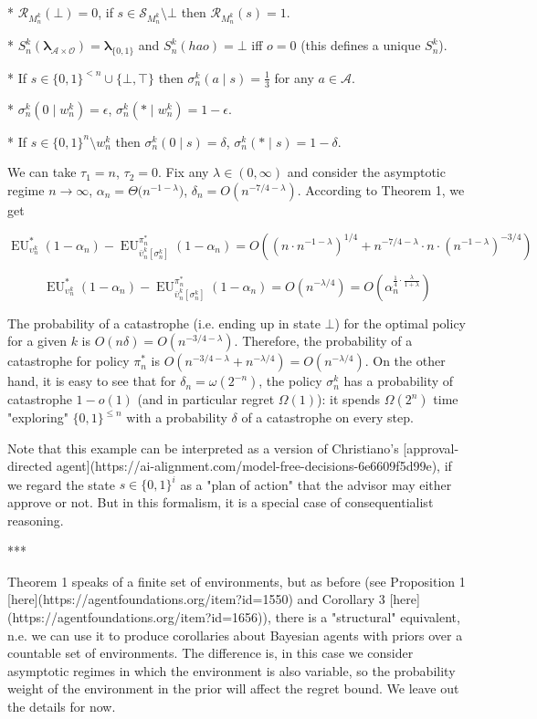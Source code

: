 \documentclass[a4paper]{article}
\newcommand{\Bool}{\{0,1\}}
\newcommand{\AP}[1]{\left(#1\right)}
\newcommand{\AB}[1]{\left[#1\right]}
\newcommand{\Estr}{\boldsymbol{\lambda}}
\newcommand{\Ob}{\mathcal{O}}
\newcommand{\A}{\mathcal{A}}
\newcommand{\St}{\mathcal{S}}
\newcommand{\R}{\mathcal{R}}
\newcommand{\EU}{\operatorname{EU}}
\begin{document}
* $\R_{M_n^k}(\bot)=0$, if $s \in \St_{M_n^k} \setminus \bot$ then $\R_{M_n^k}(s)=1$.

* $S_n^k(\Estr_{\A \times \Ob})=\Estr_{\Bool}$ and $S_n^k(hao)=\bot$ iff $o = 0$ (this defines a unique $S_n^k$).

* If $s \in \Bool^{<n} \cup \{\bot,\top\}$ then $\sigma_n^k(a \mid s) = \frac{1}{3}$ for any $a \in \A$.

* $\sigma_n^k(0 \mid w_n^k) = \epsilon$, $\sigma_n^k(* \mid w_n^k) = 1 - \epsilon$.

* If $s \in \Bool^n \setminus w_n^k$ then $\sigma_n^k(0 \mid s) = \delta$, $\sigma_n^k(* \mid s) = 1 - \delta$.

We can take $\tau_1 = n$, $\tau_2 = 0$. Fix any $\lambda \in (0,\infty)$ and consider the asymptotic regime $n \rightarrow \infty$, $\alpha_n = \Theta\Big(n^{-1-\lambda}\Big)$, $\delta_n = O\AP{n^{-7/4-\lambda}}$. According to Theorem 1, we get

$$\EU_{\upsilon_n^k}^*(1-\alpha_n) - \EU_{\bar{\upsilon}_n^k\AB{\sigma_n^k}}^{\pi_n^*}(1-\alpha_n) = O\AP{\AP{n \cdot n^{-1-\lambda}}^{1/4}+n^{-7/4-\lambda}\cdot n \cdot \AP{n^{-1-\lambda}}^{-3/4}} $$

$$\EU_{\upsilon_n^k}^*(1-\alpha_n) - \EU_{\bar{\upsilon}_n^k\AB{\sigma_n^k}}^{\pi_n^*}(1-\alpha_n) = O\AP{n^{-\lambda/4}}=O\AP{\alpha_n^{\frac{1}{4}\cdot\frac{\lambda}{1+\lambda}}}$$

The probability of a catastrophe (i.e. ending up in state $\bot$) for the optimal policy for a given $k$ is $O\AP{n\delta}=O\AP{n^{-3/4-\lambda}}$. Therefore, the probability of a catastrophe for policy $\pi_n^*$ is $O\AP{n^{-3/4-\lambda}+n^{-\lambda/4}}=O\AP{n^{-\lambda/4}}$. On the other hand, it is easy to see that for $\delta_n = \omega\AP{2^{-n}}$, the policy $\sigma_n^k$ has a probability of catastrophe $1-o(1)$ (and in particular  regret $\Omega(1)$): it spends $\Omega(2^n)$ time "exploring" $\Bool^{\leq n}$ with a probability $\delta$ of a catastrophe on every step.

Note that this example can be interpreted as a version of Christiano's [approval-directed agent](https://ai-alignment.com/model-free-decisions-6e6609f5d99e), if we regard the state $s \in \Bool^{i}$ as a "plan of action" that the advisor may either approve or not. But in this formalism, it is a special case of consequentialist reasoning.

***

Theorem 1 speaks of a finite set of environments, but as before (see Proposition 1 [here](https://agentfoundations.org/item?id=1550) and Corollary 3 [here](https://agentfoundations.org/item?id=1656)), there is a "structural" equivalent, n.e. we can use it to produce corollaries about Bayesian agents with priors over a countable set of environments. The difference is, in this case we consider asymptotic regimes in which the environment is also variable, so the probability weight of the environment in the prior will affect the regret bound. We leave out the details for now.
\end{document}
